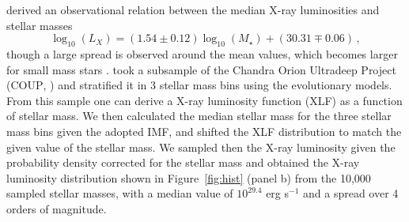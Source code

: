 \documentclass[fleqn,usenatbib,letters]{mnras}
\begin{document}
\citet{Gudel2007} derived an observational relation between the median X-ray luminosities and stellar masses
\begin{equation} \label{eq:LxMstar}
    \log_{10}(L_{X}) = (1.54\pm0.12) \log_{10}(M_\star) + (30.31\mp0.06) \,,
\end{equation}
though a large spread is observed around the mean values, which becomes larger for small mass stars \citep[e.g.][]{Getman2022}.
\citet{Kuhn2019} took a subsample of the Chandra Orion Ultradeep Project (\textsc{COUP}, \citet{Feigelson2005,Getman2005}) and stratified it in 3 stellar mass bins using the \citet{Baraffe1998} evolutionary models. From this sample one can derive a X-ray luminosity function (XLF) as a function of stellar mass.
We then calculated the median stellar mass for the three stellar mass bins 
given the adopted IMF, and shifted the XLF distribution to match the given value of the stellar mass. We sampled then the X-ray luminosity given the probability density corrected for the stellar mass and obtained the X-ray luminosity distribution shown in Figure~\ref{fig:hist} (panel b) from the 10,000 sampled stellar masses, with a median value of $10^{29.4}$ erg s$^{-1}$ and a spread over 4 orders of magnitude.
\end{document}
